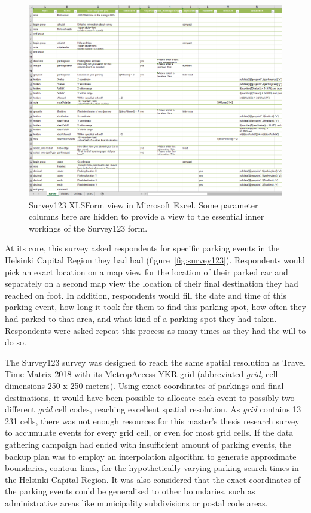 \begin{figure}[H]%
    \includegraphics[width=\textwidth]{images/survey123_xlsform.png}
    \caption[Survey123 XLSForm view]{Survey123 XLSForm view in Microsoft Excel. Some parameter columns here are hidden to provide a view to the essential inner workings of the Survey123 form.}%
    \label{fig:survey123_xlsform}%
\end{figure}

At its core, this survey asked respondents for specific parking events in the Helsinki Capital Region they had had (figure~\ref{fig:survey123}). Respondents would pick an exact location on a map view for the location of their parked car and separately on a second map view the location of their final destination they had reached on foot. In addition, respondents would fill the date and time of this parking event, how long it took for them to find this parking spot, how often they had parked to that area, and what kind of a parking spot they had taken. Respondents were asked repeat this process as many times as they had the will to do so.

The Survey123 survey was designed to reach the same spatial resolution as Travel Time Matrix 2018 with its MetropAccess-YKR-grid (abbreviated \textit{grid}, cell dimensions 250 x 250 meters). Using exact coordinates of parkings and final destinations, it would have been possible to allocate each event to possibly two different \textit{grid} cell codes, reaching excellent spatial resolution. As \textit{grid} contains 13 231 cells, there was not enough resources for this master's thesis research survey to accumulate events for every grid cell, or even for most grid cells. If the data gathering campaign had ended with insufficient amount of parking events, the backup plan was to employ an interpolation algorithm to generate approximate boundaries, contour lines, for the hypothetically varying parking search times in the Helsinki Capital Region. It was also considered that the exact coordinates of the parking events could be generalised to other boundaries, such as administrative areas like municipality subdivisions or postal code areas.

